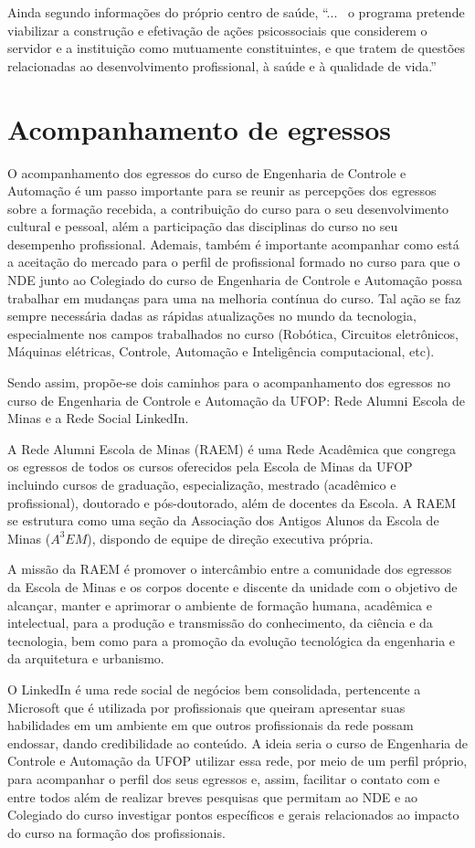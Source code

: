 \documentclass[
	12pt,				%
	openright,			%
	oneside,			%
	a4paper,			%
	english,			%
	brazil				%
	]{abntex2}
\begin{document}
Ainda segundo informações do próprio centro de saúde, ``...~ o programa pretende viabilizar a construção e efetivação de ações psicossociais que considerem o servidor e a instituição como mutuamente constituintes, e que tratem de questões relacionadas ao desenvolvimento profissional, à saúde e à qualidade de vida.''

\section{Acompanhamento de egressos}
O acompanhamento dos egressos do curso de Engenharia de Controle e Automação é um passo importante para se reunir as percepções dos egressos sobre a formação recebida, a contribuição do curso para o seu desenvolvimento cultural e pessoal, além a participação das disciplinas do curso no seu desempenho profissional. Ademais, também é importante acompanhar como está a aceitação do mercado para o perfil de profissional formado no curso para que o NDE junto ao Colegiado do curso de Engenharia de Controle e Automação possa trabalhar em mudanças para uma na melhoria contínua do curso. Tal ação se faz sempre necessária dadas as rápidas atualizações no mundo da tecnologia, especialmente nos campos trabalhados no curso (Robótica, Circuitos eletrônicos, Máquinas elétricas, Controle, Automação e Inteligência computacional, etc).

Sendo assim, propõe-se dois caminhos para o acompanhamento dos egressos no curso de Engenharia de Controle e Automação da UFOP: Rede Alumni Escola de Minas e a Rede Social LinkedIn.

A Rede Alumni Escola de Minas (RAEM) é uma Rede Acadêmica que congrega os egressos de todos os cursos oferecidos pela Escola de Minas da UFOP incluindo cursos de graduação, especialização, mestrado (acadêmico e profissional), doutorado e pós-doutorado, além de docentes da Escola. A RAEM se estrutura como uma seção da Associação dos Antigos Alunos da Escola de Minas ($A^{3}
EM$), dispondo de equipe de direção executiva própria.

A missão da RAEM é promover o intercâmbio entre a comunidade dos egressos da Escola de Minas e os corpos docente e discente da unidade com o objetivo de alcançar, manter e aprimorar o ambiente de formação humana, acadêmica e intelectual, para a produção e transmissão do conhecimento, da ciência e da tecnologia, bem como para a promoção da evolução tecnológica da engenharia e da arquitetura e urbanismo.

O LinkedIn é uma rede social de negócios bem consolidada, pertencente a Microsoft que é utilizada por profissionais que queiram apresentar suas habilidades em um ambiente em que outros profissionais da rede possam endossar, dando credibilidade ao conteúdo. A ideia seria o curso de Engenharia de Controle e Automação da UFOP utilizar essa rede, por meio de um perfil próprio, para acompanhar o perfil dos seus egressos e, assim, facilitar o contato com e entre todos além de realizar breves pesquisas que permitam ao NDE e ao Colegiado do curso investigar pontos específicos e gerais relacionados ao impacto do curso na formação dos profissionais.
\end{document}
